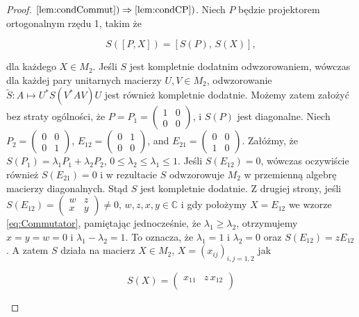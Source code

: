 \begin{proof}
$\ref{lem:condCommut}) \Rightarrow \ref{lem:condCP})$.
Niech $P$ będzie projektorem ortogonalnym rzędu 1, takim że
\begin{linenomath*}
 \begin{equation}
\label{eq:Commutator}
S([P,X]) = [S(P), \, S(X)],
 \end{equation}
\end{linenomath*}
dla każdego $X \in M_{2}$.
Jeśli $S$ jest kompletnie dodatnim odwzorowaniem, wówczas dla każdej pary
unitarnych macierzy $U, V \in M_{2}$,
odwzorowanie $\tilde{S}: A \mapsto U^{*} S(V^{*} A V) U$
jest również kompletnie dodatnie.
Możemy zatem założyć bez straty ogólności, że
$P = P_{1} =
\left(
\begin{smallmatrix} 1 & 0 \\ 0 & 0 \end{smallmatrix}
\right)$,
i $S(P)$ jest diagonalne.
Niech $P_{2} = \left(
\begin{smallmatrix} 0 & 0 \\ 0 & 1 \end{smallmatrix}
\right)$,
$E_{12} =
\left(
\begin{smallmatrix} 0 & 1 \\ 0 & 0 \end{smallmatrix}
\right)$,
and
$E_{21} =
\left(
\begin{smallmatrix} 0 & 0 \\ 1 & 0 \end{smallmatrix}
\right)$.
Załóżmy, że
$S(P_{1}) = \lambda_{1} P_{1} + \lambda_{2} P_{2}$,
$0 \leq \lambda_{2} \leq \lambda_{1} \leq 1$.
Jeśli $S(E_{12}) = 0$,
wówczas oczywiście również $S(E_{21}) = 0$ i w rezultacie
$S$ odwzorowuje $M_{2}$
w przemienną algebrę macierzy diagonalnych.
Stąd $S$ jest kompletnie dodatnie.
Z drugiej strony, jeśli
$S(E_{12}) =
\left(
\begin{smallmatrix} w & z \\ x & y \end{smallmatrix}
\right) \neq 0$,
$w, z, x, y \in \mathbb{C}$
i gdy położymy $X = E_{12}$ we wzorze \eqref{eq:Commutator},
pamiętając jednocześnie, że $\lambda_{1} \geq \lambda_{2}$,
otrzymujemy $x = y = w = 0$ i $\lambda_{1} - \lambda_{2} = 1$.
To oznacza, że $\lambda_{1} = 1$ i $\lambda_{2} = 0$ oraz
$S(E_{12}) = z E_{12}$.
A zatem $S$ działa na macierz
$X \in M_{2}$, $X = (x_{ij})_{i,j=1,2}$ jak
\begin{linenomath*}
 \begin{equation}
S(X) = \begin{pmatrix}
 x_{11} & z \, x_{12} \\

\end{pmatrix}
\end{equation}
\end{linenomath*}
\end{proof}
